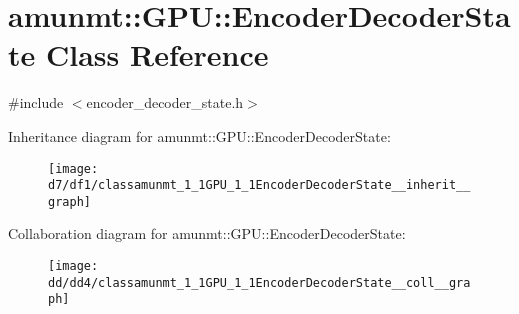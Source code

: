 \hypertarget{classamunmt_1_1GPU_1_1EncoderDecoderState}{}\section{amunmt\+:\+:G\+PU\+:\+:Encoder\+Decoder\+State Class Reference}
\label{classamunmt_1_1GPU_1_1EncoderDecoderState}


{\ttfamily \#include $<$encoder\+\_\+decoder\+\_\+state.\+h$>$}



Inheritance diagram for amunmt\+:\+:G\+PU\+:\+:Encoder\+Decoder\+State\+:
\nopagebreak
\begin{figure}[H]
\begin{center}
\leavevmode
\texttt{[image: d7/df1/classamunmt\_1\_1GPU\_1\_1EncoderDecoderState\_\_inherit\_\_graph]}
\end{center}
\end{figure}


Collaboration diagram for amunmt\+:\+:G\+PU\+:\+:Encoder\+Decoder\+State\+:
\nopagebreak
\begin{figure}[H]
\begin{center}
\leavevmode
\texttt{[image: dd/dd4/classamunmt\_1\_1GPU\_1\_1EncoderDecoderState\_\_coll\_\_graph]}
\end{center}
\end{figure}
